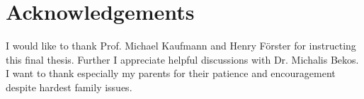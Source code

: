 \section{Acknowledgements}
I would like to thank Prof. Michael Kaufmann and Henry Förster for instructing this final thesis. Further I appreciate helpful discussions with Dr. Michalis Bekos. I want to thank especially my parents for their patience and encouragement despite hardest family issues.